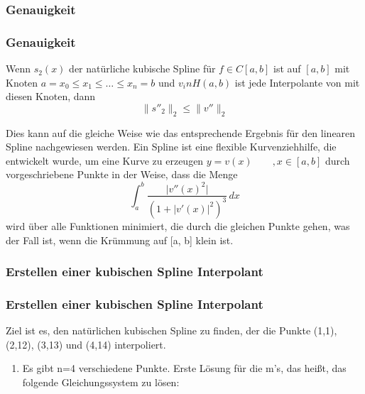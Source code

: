 {		\subsubsection{Genauigkeit}
		\begin{frame}
			\frametitle{Genauigkeit}
			\begin{theorem}[Genauigkeit]
				Wenn \(s_2(x)\) der natürliche kubische Spline für \(f \in C[a,b]\) ist auf \([a,b]\) mit Knoten \(a=x_0 \leq x_1 \leq \dots \leq x_n =b\) und \(v_in H(a,b)\) ist jede Interpolante von mit diesen Knoten, dann \[ \lVert s''_2 \rVert_{2}  \leq \lVert  v'' \rVert_{2}\]
			\end{theorem}
		\end{frame}
		Dies kann auf die gleiche Weise wie das entsprechende Ergebnis für den linearen Spline nachgewiesen werden.
		Ein Spline ist eine flexible Kurvenziehhilfe, die entwickelt wurde, um eine Kurve zu erzeugen \(y=v(x) \hspace{2em},x \in [a,b]\) durch vorgeschriebene Punkte in der Weise, dass die Menge 
		\[ \int_{a}^{b} \frac{\lvert v''(x)^2 \rvert}{(1 +  \lvert v'(x) \rvert^2)^3}  \,dx \]
		\noindent wird über alle Funktionen minimiert, die durch die gleichen Punkte gehen, was der Fall ist, wenn die Krümmung auf [a, b] klein ist.\cite{Accuracy}
		
		
		\subsubsection{Erstellen einer kubischen Spline Interpolant}
		\begin{frame}
			\frametitle{Erstellen einer kubischen Spline Interpolant}
			Ziel ist es, den natürlichen kubischen Spline zu finden, der die Punkte (1,1), (2,12), (3,13) und (4,14) interpoliert.
		\end{frame}
		
		
		\begin{enumerate}
			\item Es gibt n=4 verschiedene Punkte. Erste Lösung für die m’s, das heißt, das folgende Gleichungssystem zu lösen:
			

\end{enumerate}}
